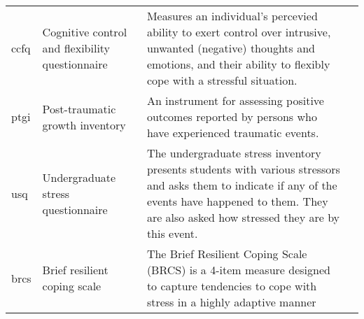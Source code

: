 \documentclass[]{book}
\begin{document}
\begin{longtable}[]{@{}llll@{}}
\begin{minipage}[t]{0.22\columnwidth}
ccfq\strut
\end{minipage} & \begin{minipage}[t]{0.27\columnwidth}\raggedright
Cognitive control and flexibility questionnaire\strut
\end{minipage} & \begin{minipage}[t]{0.22\columnwidth}\raggedright
Measures an individual's percevied ability to exert control over intrusive, unwanted (negative) thoughts and emotions, and their ability to flexibly cope with a stressful situation.\strut
\end{minipage} & \begin{minipage}[t]{0.18\columnwidth}\raggedright
\strut
\end{minipage}\tabularnewline
\begin{minipage}[t]{0.22\columnwidth}\raggedright
ptgi\strut
\end{minipage} & \begin{minipage}[t]{0.27\columnwidth}\raggedright
Post-traumatic growth inventory\strut
\end{minipage} & \begin{minipage}[t]{0.22\columnwidth}\raggedright
An instrument for assessing positive outcomes reported by persons who have experienced traumatic events.\strut
\end{minipage} & \begin{minipage}[t]{0.18\columnwidth}\raggedright
\strut
\end{minipage}\tabularnewline
\begin{minipage}[t]{0.22\columnwidth}\raggedright
usq\strut
\end{minipage} & \begin{minipage}[t]{0.27\columnwidth}\raggedright
Undergraduate stress questionnaire\strut
\end{minipage} & \begin{minipage}[t]{0.22\columnwidth}\raggedright
The undergraduate stress inventory presents students with various stressors and asks them to indicate if any of the events have happened to them. They are also asked how stressed they are by this event.\strut
\end{minipage} & \begin{minipage}[t]{0.18\columnwidth}\raggedright
\strut
\end{minipage}\tabularnewline
\begin{minipage}[t]{0.22\columnwidth}\raggedright
brcs\strut
\end{minipage} & \begin{minipage}[t]{0.27\columnwidth}\raggedright
Brief resilient coping scale\strut
\end{minipage} & \begin{minipage}[t]{0.22\columnwidth}\raggedright
The Brief Resilient Coping Scale (BRCS) is a 4-item measure designed to capture tendencies to cope with stress in a highly adaptive manner\strut
\end{minipage} & \begin{minipage}[t]{0.18\columnwidth}\raggedright
\strut
\end{minipage}\tabularnewline
\bottomrule
\end{longtable}
\end{document}
